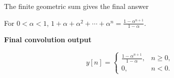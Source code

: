 \documentclass[aspectratio=169,11pt]{beamer}
\newcommand{\CardTitleSize}{\large}
\newcommand{\CardTitle}[1]{%
  \vspace{0.15cm}
  {\CardTitleSize\bfseries #1}\par
}
\begin{document}
\begin{frame}{The finite geometric sum gives the final answer}

\begin{BlueBox}[
  calloutshadedblue,
  fontupper=\large,
  halign=center
]{}
For \(0<\alpha<1\),
\(
1+\alpha+\alpha^2+\cdots+\alpha^n
=
\frac{1-\alpha^{n+1}}{1-\alpha}.
\)
\end{BlueBox}

\vspace{0.12cm}

\begin{center}
\begin{GreenCard}[width=0.88\textwidth,halign=center,top=12pt,bottom=12pt]
\CardTitle{Final convolution output}

\vspace{0.08cm}

{\Large
\[
y[n]
=
\begin{cases}
\displaystyle \frac{1-\alpha^{n+1}}{1-\alpha}, & n\ge 0,\\[8pt]
0, & n<0.
\end{cases}
\]
}



\end{GreenCard}
\end{center}

\end{frame}
\end{document}
